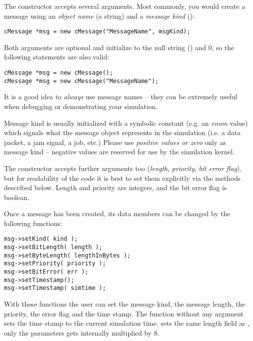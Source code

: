The  constructor accepts several arguments.
Most commonly, you would create a message using an \textit{object name}
(a  string) and a \textit{message kind} ():

\begin{verbatim}
cMessage *msg = new cMessage("MessageName", msgKind);
\end{verbatim}

Both arguments are optional and initialize to the null string ()
and 0, so the following statements are also valid:

\begin{verbatim}
cMessage *msg = new cMessage();
cMessage *msg = new cMessage("MessageName");
\end{verbatim}

It is a good idea to \textit{always} use message names -- they can be
extremely useful when debugging or demonstrating your simulation.

Message kind is usually initialized with a symbolic constant
(e.g. an \textit{enum} value) which signals what the message object
represents in the simulation (i.e. a data packet, a jam signal, a job, etc.)
Please use \textit{positive values or zero} only as message kind --
negative values are reserved for use by the simulation kernel.


The  constructor accepts further arguments too
(\textit{length}, \textit{priority}, \textit{bit error flag}),
but for readability of the code it is best to set them explicitly
via the  methods described below.
Length and priority are integers, and the bit error flag is boolean.


Once a message has been created, its data members can be changed by the following functions:

\begin{verbatim}
msg->setKind( kind );
msg->setBitLength( length );
msg->setByteLength( lengthInBytes );
msg->setPriority( priority );
msg->setBitError( err );
msg->setTimestamp();
msg->setTimestamp( simtime );
\end{verbatim}

With these functions the user can set the message
kind, the message length,
the priority, the error
flag and the time stamp. The  function without any argument
sets the time stamp to the current simulation time.
 sets the same length field as ,
only the parameters gets internally multiplied by 8.

